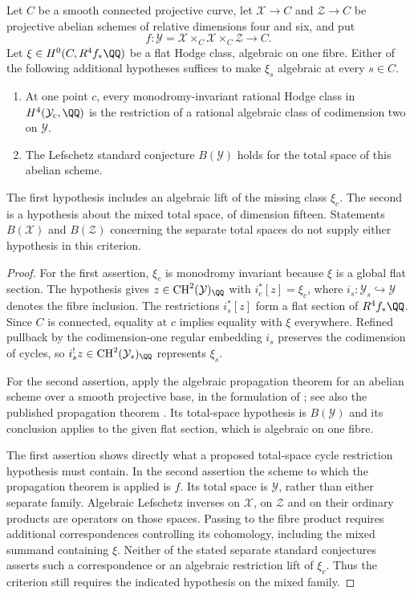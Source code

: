 \begin{proposition}\label{v7:total-space-hypothesis}
Let $C$ be a smooth connected projective curve, let $\mathcal X\to C$
and $\mathcal Z\to C$ be projective abelian schemes of relative
dimensions four and six, and put
\[
 f:\mathcal Y=\mathcal X\times_C\mathcal X\times_C\mathcal Z\to C.
\]
Let $\xi\in H^0(C,R^4f_*\QQ)$ be a flat Hodge class, algebraic on one
fibre.  Either of the following additional hypotheses suffices to make
$\xi_s$ algebraic at every $s\in C$.
\begin{enumerate}
\item At one point $c$, every monodromy-invariant rational Hodge class
  in $H^4(\mathcal Y_c,\QQ)$ is the restriction of a rational
  algebraic class of codimension two on $\mathcal Y$.
\item The Lefschetz standard conjecture $B(\mathcal Y)$ holds for the
  total space of this abelian scheme.
\end{enumerate}
The first hypothesis includes an algebraic lift of the missing class
$\xi_c$.  The second is a hypothesis about the mixed total space, of
dimension fifteen.  Statements $B(\mathcal X)$ and $B(\mathcal Z)$
concerning the separate total spaces do not supply either hypothesis
in this criterion.
\end{proposition}

\begin{proof}
For the first assertion, $\xi_c$ is monodromy invariant because $\xi$ is
a global flat section.  The hypothesis gives
$z\in\operatorname{CH}^2(\mathcal Y)_{\QQ}$ with
$i_c^*[z]=\xi_c$, where $i_s:\mathcal Y_s\hookrightarrow\mathcal Y$
denotes the fibre inclusion.  The restrictions $i_s^*[z]$ form a flat
section of $R^4f_*\QQ$.  Since $C$ is connected, equality at $c$
implies equality with $\xi$ everywhere.  Refined pullback by the
codimension-one regular embedding $i_s$ preserves the codimension of
cycles, so $i_s^!z\in\operatorname{CH}^2(\mathcal Y_s)_{\QQ}$
represents $\xi_s$.

For the second assertion, apply the algebraic propagation theorem for
an abelian scheme over a smooth projective base, in the formulation
of \cite[\S5, Proposition~1]{Milne20}; see also the published propagation theorem \cite{Abd94}.  Its total-space hypothesis is
$B(\mathcal Y)$ and its conclusion applies to the given flat section,
which is algebraic on one fibre.

The first assertion shows directly what a proposed total-space cycle
restriction hypothesis must contain.  In the second assertion the
scheme to which the propagation theorem is applied is $f$.  Its total
space is $\mathcal Y$, rather than either separate family.
Algebraic Lefschetz inverses on $\mathcal X$, on $\mathcal Z$ and on
their ordinary products are operators on those spaces.  Passing to
the fibre product requires additional correspondences controlling
its cohomology, including the mixed summand containing $\xi$.
Neither of the stated separate standard conjectures asserts such a
correspondence or an algebraic restriction lift of $\xi_c$.
Thus the criterion still requires the indicated hypothesis on the
mixed family.
\end{proof}

